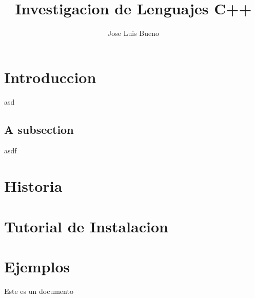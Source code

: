 \documentclass[10pt,a4paper,titlepage]{article}
\title{Investigacion de Lenguajes C++}
\author{Jose Luis Bueno}
\begin{document}
\section{Introduccion}
asd
\subsection{A subsection}
asdf
\section{Historia}
\section{Tutorial de Instalacion}
\section{Ejemplos}
Este es un documento
\end{document}
